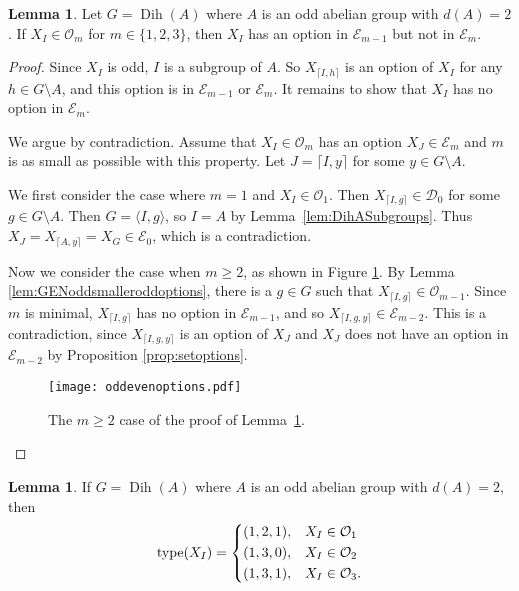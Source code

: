 \documentclass[12pt]{amsart}
\theoremstyle{definition}
\newtheorem{lemma}[equation]{Lemma}
\theoremstyle{definition}
\numberwithin{equation}{section}
\begin{document}
\begin{lemma}\label{lem:GENoddevenoptions}
Let $G={\operatorname{Dih}}(A)$ where $A$ is an odd abelian group with ${d}(A)=2$.  If $X_I \in \mathcal{O}_m$ for $m \in \{1,2,3\}$, 
then $X_I$ has an option in $\mathcal{E}_{m-1}$ but not in $\mathcal{E}_{m}$. 
\end{lemma}

\begin{proof}
Since $X_I$ is odd, $I$ is a subgroup of $A$.
So $X_{\lceil I,h\rceil}$ is an option of $X_I$ for any $h\in G\setminus A$, and this option is in $\mathcal{E}_{m-1}$ or $\mathcal{E}_{m}$.
It remains to show that $X_I$ has no option in $\mathcal{E}_{m}$.

We argue by contradiction.  Assume that $X_I \in \mathcal{O}_m$ has an option $X_J \in \mathcal{E}_m$ and $m$ is as small as possible with this property.
Let $J=\lceil I,y \rceil$ for some $y\in G\setminus A$. 

We first consider the case where $m=1$ and $X_I \in \mathcal{O}_1$. 
Then $X_{\lceil I, g \rceil} \in \mathcal{D}_0$ for some $g \in G\setminus A$.  
Then $G=\langle I,g \rangle$, so $I=A$ by Lemma~\ref{lem:DihASubgroups}.
Thus $X_J=X_{\lceil A,y \rceil}=X_G \in \mathcal{E}_0$, which is a contradiction. 

Now we consider the case when $m\ge 2$, as shown in Figure \ref{fig:oddevenoptions}.
By Lemma \ref{lem:GENoddsmalleroddoptions}, there is a $g \in G$ such that $X_{\lceil I, g\rceil} \in \mathcal{O}_{m-1}$.  
Since $m$ is minimal, $X_{\lceil I, g\rceil}$ has no option in $\mathcal{E}_{m-1}$, and so  $X_{\lceil I, g, y\rceil} \in \mathcal{E}_{m-2}$.
This is a contradiction, since $X_{\lceil I, g, y\rceil}$ is an option of $X_J$ and $X_J$ does not have an option in $\mathcal{E}_{m-2}$ by
Proposition \ref{prop:setoptions}.

\begin{figure}
\texttt{[image: oddevenoptions.pdf]}
\caption{\label{fig:oddevenoptions}The $m\ge 2$ case of the proof of Lemma~\ref{lem:GENoddevenoptions}.}
\end{figure}
\end{proof}

\begin{lemma}\label{lem:oddGENoddtypes}
If $G={\operatorname{Dih}}(A)$ where $A$ is an odd abelian group with ${d}(A)=2$, then 
\[
   {\operatorname{type}}(X_I) = 
    \begin{dcases}
       (1,2,1), & X_I \in \mathcal{O}_1\\
       (1,3,0), & X_I \in \mathcal{O}_2\\
       (1,3,1), & X_I \in \mathcal{O}_{3}.
    \end{dcases}
\] 
\end{lemma}
\end{document}
